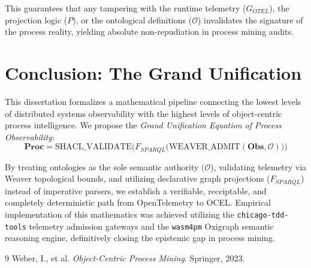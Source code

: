 \documentclass[12pt,a4paper,oneside]{book}
\begin{document}
This guarantees that any tampering with the runtime telemetry ($G_{OTEL}$), the projection logic ($P$), or the ontological definitions ($\mathcal{O}$) invalidates the signature of the process reality, yielding absolute non-repudiation in process mining audits.

\chapter{Conclusion: The Grand Unification}
This dissertation formalizes a mathematical pipeline connecting the lowest levels of distributed systems observability with the highest levels of object-centric process intelligence. We propose the \textit{Grand Unification Equation of Process Observability}:
$$ \mathbf{Proc} = \text{SHACL\_VALIDATE} \Big( F_{SPARQL} \big(\text{WEAVER\_ADMIT}( \mathbf{Obs}, \mathcal{O} ) \big) \Big) $$

By treating ontologies as the sole semantic authority ($\mathcal{O}$), validating telemetry via Weaver topological bounds, and utilizing declarative graph projections ($F_{SPARQL}$) instead of imperative parsers, we establish a verifiable, receiptable, and completely deterministic path from OpenTelemetry to OCEL. Empirical implementation of this mathematics was achieved utilizing the \texttt{chicago-tdd-tools} telemetry admission gateways and the \texttt{wasm4pm} Oxigraph semantic reasoning engine, definitively closing the epistemic gap in process mining.

\backmatter
\begin{thebibliography}{9}
Weber, I., et al. \textit{Object-Centric Process Mining}. Springer, 2023.
\end{thebibliography}
\end{document}
